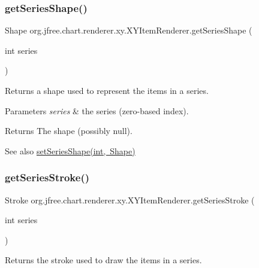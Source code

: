 \subsubsection{\texorpdfstring{get\+Series\+Shape()}{getSeriesShape()}}
{\footnotesize\ttfamily Shape org.\+jfree.\+chart.\+renderer.\+xy.\+X\+Y\+Item\+Renderer.\+get\+Series\+Shape (\begin{DoxyParamCaption}\item[{int}]{series }\end{DoxyParamCaption})}

Returns a shape used to represent the items in a series.


\begin{DoxyParams}{Parameters}
{\em series} & the series (zero-\/based index).\\
\hline
\end{DoxyParams}
\begin{DoxyReturn}{Returns}
The shape (possibly {\ttfamily null}).
\end{DoxyReturn}
\begin{DoxySeeAlso}{See also}
\mbox{\hyperlink{interfaceorg_1_1jfree_1_1chart_1_1renderer_1_1xy_1_1_x_y_item_renderer_af6269fff1133f74297f63ef2fa5beac6}{set\+Series\+Shape(int, Shape)}} 
\end{DoxySeeAlso}
\mbox{\label{interfaceorg_1_1jfree_1_1chart_1_1renderer_1_1xy_1_1_x_y_item_renderer_a424b6a0660bc162300ba763f2c6656ea}} 
\subsubsection{\texorpdfstring{get\+Series\+Stroke()}{getSeriesStroke()}}
{\footnotesize\ttfamily Stroke org.\+jfree.\+chart.\+renderer.\+xy.\+X\+Y\+Item\+Renderer.\+get\+Series\+Stroke (\begin{DoxyParamCaption}\item[{int}]{series }\end{DoxyParamCaption})}

Returns the stroke used to draw the items in a series.


